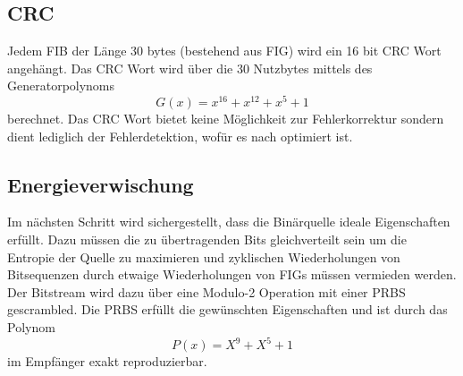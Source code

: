 \subsection{\ac{CRC}}
Jedem \ac{FIB} der Länge 30 bytes (bestehend aus \ac{FIG}) wird ein 16 bit \ac{CRC} Wort angehängt. Das \ac{CRC} Wort wird über die 30 Nutzbytes mittels des Generatorpolynoms
\begin{equation}
G(x) = x^{16} + x^{12} + x^5 + 1
\end{equation}
berechnet. Das CRC Wort bietet keine Möglichkeit zur Fehlerkorrektur sondern dient lediglich der Fehlerdetektion, wofür es nach \cite{crc:recommendation} optimiert ist.

\subsection{Energieverwischung}
\label{sec:energieverwischung}
Im nächsten Schritt wird sichergestellt, dass die Binärquelle ideale Eigenschaften erfüllt. Dazu müssen die zu übertragenden Bits gleichverteilt sein um die Entropie der Quelle zu maximieren und zyklischen Wiederholungen von Bitsequenzen durch etwaige Wiederholungen von \ac{FIG}s müssen vermieden werden. Der Bitstream wird dazu über eine Modulo-2 Operation mit einer \ac{PRBS} gescrambled. Die \ac{PRBS} erfüllt die gewünschten Eigenschaften und ist durch das Polynom
\begin{equation}
P(x) = X^9 + X^5 + 1
\end{equation}
im Empfänger exakt reproduzierbar.

